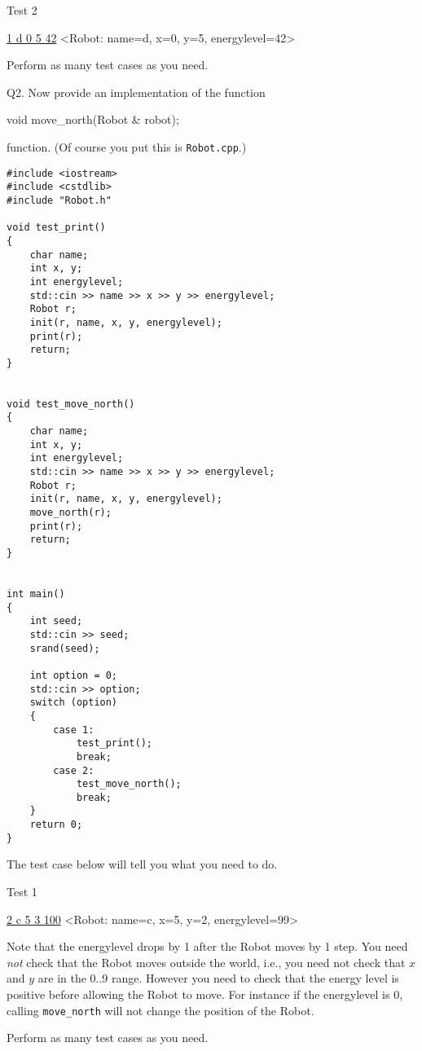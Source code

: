 Test 2
\begin{console}[commandchars=\\\{\}]
\underline{1 d 0 5 42}
<Robot: name=d, x=0, y=5, energylevel=42>
\end{console}


Perform as many test cases as you need.

\newpage
Q2.
Now provide an implementation of the function
{\small
\begin{console}
void move_north(Robot & robot);
\end{console}
}
function.
(Of course you put this is \verb!Robot.cpp!.)

{\small
\begin{Verbatim}[frame=single]
#include <iostream>
#include <cstdlib>
#include "Robot.h"

void test_print()
{
    char name;
    int x, y;
    int energylevel;
    std::cin >> name >> x >> y >> energylevel;
    Robot r;
    init(r, name, x, y, energylevel);
    print(r);
    return;
}


void test_move_north()
{
    char name;
    int x, y;
    int energylevel;
    std::cin >> name >> x >> y >> energylevel;
    Robot r;
    init(r, name, x, y, energylevel);
    move_north(r);
    print(r);
    return;
}


int main()
{
    int seed;
    std::cin >> seed;
    srand(seed);
    
    int option = 0;
    std::cin >> option;
    switch (option)
    {
        case 1:
            test_print();
            break;         
        case 2:
            test_move_north();
            break;
    }
    return 0;
}      
\end{Verbatim}
}

The test case below will tell you what you need to do.

Test 1
\begin{console}[commandchars=\\\{\}]
\underline{2 c 5 3 100}
<Robot: name=c, x=5, y=2, energylevel=99>
\end{console}
Note that the energylevel drops by 1 after the Robot moves by 1 step.
You need \textit{not} check that the Robot moves outside the world, i.e.,
you need not check that $x$ and $y$ are in the 0..9 range.
However you need to check that the energy level is positive
before allowing the Robot to move.
For instance if the energylevel is 0, calling \verb!move_north!
will not change the position of the Robot.

Perform as many test cases as you need.

